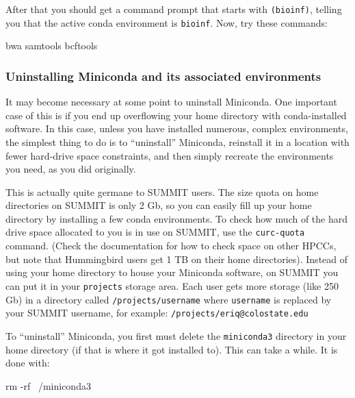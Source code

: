 \documentclass[]{krantz}
\makeatletter
\newenvironment{Shaded}{\begin{snugshade}}{\end{snugshade}}
\newcommand{\ExtensionTok}[1]{#1}
\newcommand{\FunctionTok}[1]{\textcolor[rgb]{0,0,0}{#1}}
\newcommand{\NormalTok}[1]{#1}
\newenvironment{kframe}{%
\medskip{}
\setlength{\fboxsep}{.8em}
 \def\at@end@of@kframe{}%
 \ifinner\ifhmode%
  \def\at@end@of@kframe{\end{minipage}}%
  \begin{minipage}{\columnwidth}%
 \fi\fi%
 \def\FrameCommand##1{\hskip\@totalleftmargin \hskip-\fboxsep
 \colorbox{shadecolor}{##1}\hskip-\fboxsep
     \hskip-\linewidth \hskip-\@totalleftmargin \hskip\columnwidth}%
 \MakeFramed {\advance\hsize-\width
   \@totalleftmargin\z@ \linewidth\hsize
   \@setminipage}}%
 {\par\unskip\endMakeFramed%
 \at@end@of@kframe}
\renewenvironment{Shaded}{\begin{kframe}}{\end{kframe}}
\makeatother
\begin{document}
After that you should get a command prompt that starts with \texttt{(bioinf)}, telling you that the
active conda environment is \texttt{bioinf}. Now, try these commands:

\begin{Shaded}
\begin{Highlighting}[]
\ExtensionTok{bwa}
\ExtensionTok{samtools}
\ExtensionTok{bcftools}
\end{Highlighting}
\end{Shaded}

\hypertarget{uninstalling-miniconda-and-its-associated-environments}{%
\subsubsection{Uninstalling Miniconda and its associated environments}\label{uninstalling-miniconda-and-its-associated-environments}}

It may become necessary at some point to uninstall Miniconda. One important case of this
is if you end up overflowing your home directory with conda-installed software. In this case,
unless you have installed numerous, complex environments, the simplest thing to do is
to ``uninstall'' Miniconda, reinstall it in a location with fewer hard-drive space constraints,
and then simply recreate the environments you need, as you did originally.

This is actually quite germane to SUMMIT users. The size quota on home directories on SUMMIT is
only 2 Gb, so you can easily fill up your home directory by installing a few conda environments.
To check how much of the hard
drive space allocated to you is in use on SUMMIT, use the \texttt{curc-quota} command. (Check the documentation
for how to check space on other HPCCs, but note that Hummingbird users get 1 TB on their home
directories). Instead of
using your home directory to house your Miniconda software, on SUMMIT you can put it in your
\texttt{projects} storage area. Each user gets more storage (like 250 Gb) in a directory
called \texttt{/projects/username} where \texttt{username} is replaced by your SUMMIT username,
for example: \texttt{/projects/eriq@colostate.edu}

To ``uninstall'' Miniconda, you first must delete the \texttt{miniconda3} directory in your
home directory (if that is where it got installed to). This can take a while. It is done with:

\begin{Shaded}
\begin{Highlighting}[]
\FunctionTok{rm}\NormalTok{ -rf ~/miniconda3}
\end{Highlighting}
\end{Shaded}
\end{document}
